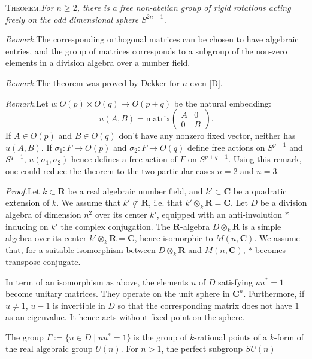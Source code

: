 \documentclass[10pt,a4paper]{article}
\newcommand{\TheoremBlock}[1]{\par\vspace{0.7em}\noindent\hspace{1.4em}\textsc{Theorem.}\quad\textit{#1}\par}
\newcommand{\RemarkBlock}[1]{\par\vspace{0.55em}\noindent\hspace{1.4em}\textit{Remark.}\quad #1\par}
\begin{document}
\TheoremBlock{For $n\geq 2$, there is a free non-abelian group of rigid rotations
acting freely on the odd dimensional sphere $S^{2n-1}$.}

\RemarkBlock{The corresponding orthogonal matrices can be chosen to have
algebraic entries, and the group of matrices corresponds to a subgroup of the
non-zero elements in a division algebra over a number field.}

\RemarkBlock{The theorem was proved by Dekker for $n$ even [D].}

\RemarkBlock{Let $u:O(p)\times O(q)\to O(p+q)$ be the natural embedding:
\[
u(A,B)=\text{matrix}\begin{pmatrix}A&0\\0&B\end{pmatrix}.
\]
If $A\in O(p)$ and $B\in O(q)$ don't have any nonzero fixed vector, neither has
$u(A,B)$. If $\sigma_1:F\to O(p)$ and $\sigma_2:F\to O(q)$ define free actions on $S^{p-1}$ and
$S^{q-1}$, $u(\sigma_1,\sigma_2)$ hence defines a free action of $F$ on $S^{p+q-1}$. Using this remark,
one could reduce the theorem to the two particular cases $n=2$ and $n=3$.}

\par\vspace{0.55em}\noindent\hspace{1.4em}\textit{Proof.}\quad Let $k\subset\mathbf{R}$ be a real algebraic number field, and $k'\subset\mathbf{C}$ be a quadratic extension of $k$. We assume that $k'\not\subset\mathbf{R}$, i.e. that $k'\otimes_k\mathbf{R}=\mathbf{C}$. Let $D$ be a
division algebra of dimension $n^2$ over its center $k'$, equipped with an anti-involution
$*$ inducing on $k'$ the complex conjugation. The $\mathbf{R}$-algebra $D\otimes_k\mathbf{R}$ is
a simple algebra over its center $k'\otimes_k\mathbf{R}=\mathbf{C}$, hence isomorphic to $M(n,\mathbf{C})$.
We assume that, for a suitable isomorphism between $D\otimes_k\mathbf{R}$ and $M(n,\mathbf{C})$, $*$
becomes transpose conjugate.

In term of an isomorphism as above, the elements $u$ of $D$ satisfying $uu^*=1$
become unitary matrices. They operate on the unit sphere in $\mathbf{C}^n$. Furthermore,
if $u\neq1$, $u-1$ is invertible in $D$ so that the corresponding matrix does not
have $1$ as an eigenvalue. It hence acts without fixed point on the sphere.

The group $\Gamma:=\{u\in D\mid uu^*=1\}$ is the group of $k$-rational points of a
$k$-form of the real algebraic group $U(n)$. For $n>1$, the perfect subgroup $SU(n)$
\end{document}
